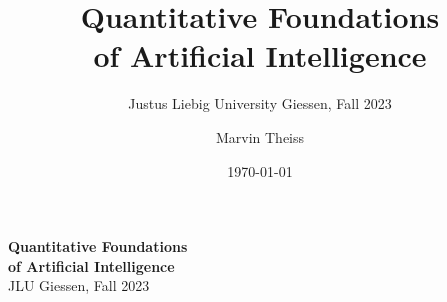 
\subject{Lecture Notes}
\title{Quantitative Foundations\\ of Artificial Intelligence}
\subtitle{Justus Liebig University Giessen, Fall 2023}
\author{Marvin Theiss}
\date{\today}



\begin{titlepage}
    \begin{flushright}
        {
            \bfseries\fontsize{40}{40}\selectfont
            Quantitative Foundations\\
            of Artificial Intelligence\\[24pt]
        }
        {
            \fontsize{32}{36}\selectfont
            JLU Giessen, Fall 2023
        }
    \end{flushright}

\end{titlepage}

\cleardoublepage
\restoregeometry
{}

\uppertitleback{
    This work \copyright{} 2024 by \href{https://github.com/mrvnthss}{Marvin Theiss} is licensed under \href{https://creativecommons.org/licenses/by-nc-sa/4.0/}{CC BY-NC-SA 4.0} \ccbyncsa \\

    You are free to distribute, remix, adapt, and build upon the material in any medium or format. You must give \href{https://creativecommons.org/licenses/by-nc-sa/4.0/\#ref-appropriate-credit}{appropriate credit}, provide a link to the license, and \href{https://creativecommons.org/licenses/by-nc-sa/4.0/\#ref-indicate-changes}{indicate if changes were made}. You may do so in any reasonable manner, but not in any way that suggests the licensor endorses you or your use. You may not use the material for \href{https://creativecommons.org/licenses/by-nc-sa/4.0/\#ref-commercial-purposes}{commercial purposes}. If you remix, transform, or build upon the material, you must distribute your contributions under the \href{https://creativecommons.org/licenses/by-nc-sa/4.0/\#ref-same-license}{same license} as the original. You may not apply legal terms or \href{https://creativecommons.org/licenses/by-nc-sa/4.0/\#ref-technological-measures}{technological measures} that legally restrict others from doing anything the license permits.
}

